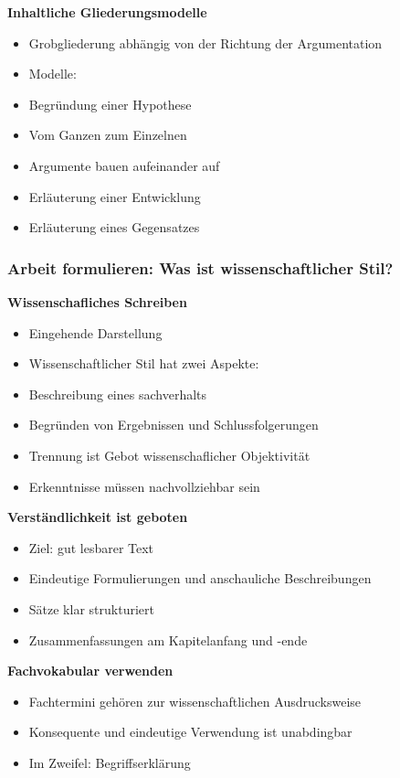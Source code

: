 \textbf{Inhaltliche Gliederungsmodelle}

\begin{itemize}%
\item
  Grobgliederung abhängig von der Richtung der Argumentation
\item
  Modelle:
\item
  Begründung einer Hypothese
\item
  Vom Ganzen zum Einzelnen
\item
  Argumente bauen aufeinander auf
\item
  Erläuterung einer Entwicklung
\item
  Erläuterung eines Gegensatzes
\end{itemize}

\subsubsection{Arbeit formulieren: Was ist wissenschaftlicher
Stil?}\label{arbeit-formulieren-was-ist-wissenschaftlicher-stil}

\textbf{Wissenschafliches Schreiben}

\begin{itemize}%
\item
  Eingehende Darstellung
\item
  Wissenschaftlicher Stil hat zwei Aspekte:
\item
  Beschreibung eines sachverhalts
\item
  Begründen von Ergebnissen und Schlussfolgerungen
\item
  Trennung ist Gebot wissenschaflicher Objektivität
\item
  Erkenntnisse müssen nachvollziehbar sein
\end{itemize}

\textbf{Verständlichkeit ist geboten}

\begin{itemize}%
\item
  Ziel: gut lesbarer Text
\item
  Eindeutige Formulierungen und anschauliche Beschreibungen
\item
  Sätze klar strukturiert
\item
  Zusammenfassungen am Kapitelanfang und -ende
\end{itemize}

\textbf{Fachvokabular verwenden}

\begin{itemize}%
\item
  Fachtermini gehören zur wissenschaftlichen Ausdrucksweise
\item
  Konsequente und eindeutige Verwendung ist unabdingbar
\item
  Im Zweifel: Begriffserklärung
\end{itemize}

